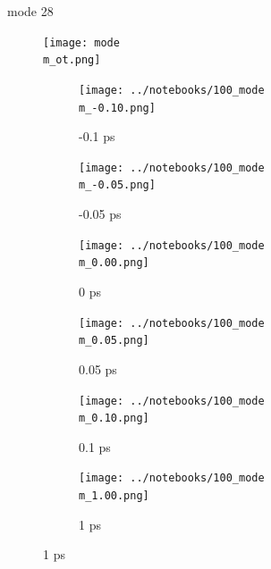 \documentclass{beamer}
\newcommand\w{0.32}
\begin{document}
\renewcommand\m{28}
\begin{frame}{mode \m}
					\vspace{\vh mm}
	\begin{figure}
		\centering
		\texttt{[image: mode\\m\_ot.png]}
	\end{figure}
	\begin{figure}
		\centering
		\begin{subfigure}[b]{\w\textwidth}
			\centering
			\texttt{[image: ../notebooks/100\_mode\\m\_-0.10.png]}
			\caption{-0.1 ps}
		\end{subfigure}
		\begin{subfigure}[b]{\w\textwidth}
			\centering
			\texttt{[image: ../notebooks/100\_mode\\m\_-0.05.png]}
			\caption{-0.05 ps}
		\end{subfigure}
		\begin{subfigure}[b]{\w\textwidth}
			\centering
			\texttt{[image: ../notebooks/100\_mode\\m\_0.00.png]}
			\caption{0 ps}
		\end{subfigure}
		\begin{subfigure}[b]{\w\textwidth}
			\centering
			\texttt{[image: ../notebooks/100\_mode\\m\_0.05.png]}
			\caption{0.05 ps}
		\end{subfigure}
		\begin{subfigure}[b]{\w\textwidth}
			\centering
			\texttt{[image: ../notebooks/100\_mode\\m\_0.10.png]}
			\caption{0.1 ps}
		\end{subfigure}
		\begin{subfigure}[b]{\w\textwidth}
			\centering
			\texttt{[image: ../notebooks/100\_mode\\m\_1.00.png]}
			\caption{1 ps}
		\end{subfigure}
	\end{figure}
\end{frame}
\end{document}

